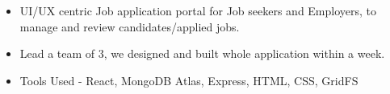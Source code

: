 \documentclass[10pt,a4paper,ragged2e]{altacv}
\begin{document}
\begin{itemize}
\item UI/UX centric Job application portal for Job seekers and Employers, to manage and review candidates/applied jobs.
\item Lead a team of 3, we designed and built whole application within a week.
\item Tools Used - React, MongoDB Atlas, Express, HTML, CSS, GridFS
\end{itemize}












\clearpage

% 
% 
% 
% 
% 
% 
% 
\end{document}
